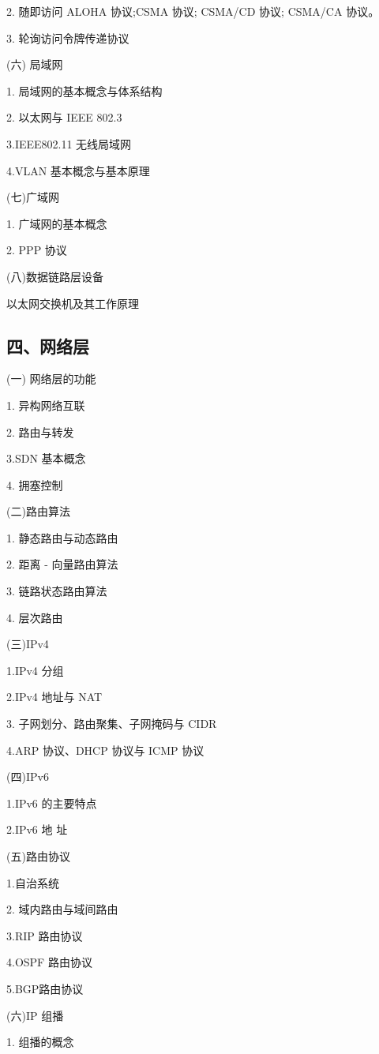 \documentclass[10pt]{article}
\begin{document}
2. {\color{red} 随即访问 ALOHA 协议;CSMA 协议;} CSMA/CD 协议; CSMA/CA 协议。 

3. 轮询访问令牌传递协议

(六) 局域网

1. 局域网的基本概念与体系结构

2. 以太网与 IEEE 802.3 

3.IEEE802.11 无线局域网 

4.VLAN 基本概念与基本原理

(七)广域网

1. 广域网的基本概念

2.{\color{red} PPP 协议}

(八)数据链路层设备

{\color{red}以太网交换机及其工作原理}

\subsection*{四、网络层}

(一) 网络层的功能

1. 异构网络互联

2. 路由与转发

3.{\color{red}SDN 基本概念}

4. 拥塞控制

(二)路由算法

1. 静态路由与动态路由

2. 距离 - 向量路由算法

3. 链路状态路由算法

4. 层次路由 

(三)IPv4 

1.IPv4 分组 

2.IPv4 地址与 NAT 

3. 子网划分、路由聚集、子网掩码与 CIDR 

4.ARP 协议、DHCP 协议与 ICMP 协议 

(四){\color{red}IPv6} 

1.IPv6 的主要特点 

2.IPv6 地 址

(五)路由协议

1.自治系统 

2. 域内路由与域间路由 

3.RIP 路由协议 

4.OSPF 路由协议 

5.{\color{red}BGP路由协议}


(六){\color{red}IP 组播}


1. 组播的概念
\end{document}
